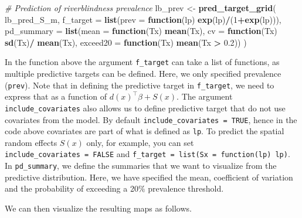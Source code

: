 \documentclass[
  letterpaper,
]{krantz}
\newenvironment{Shaded}{\begin{snugshade}}{\end{snugshade}}
\newcommand{\AttributeTok}[1]{\textcolor[rgb]{0.13,0.29,0.53}{#1}}
\newcommand{\CommentTok}[1]{\textcolor[rgb]{0.56,0.35,0.01}{\textit{#1}}}
\newcommand{\ControlFlowTok}[1]{\textcolor[rgb]{0.13,0.29,0.53}{\textbf{#1}}}
\newcommand{\DecValTok}[1]{\textcolor[rgb]{0.00,0.00,0.81}{#1}}
\newcommand{\FloatTok}[1]{\textcolor[rgb]{0.00,0.00,0.81}{#1}}
\newcommand{\FunctionTok}[1]{\textcolor[rgb]{0.13,0.29,0.53}{\textbf{#1}}}
\newcommand{\NormalTok}[1]{#1}
\newcommand{\OtherTok}[1]{\textcolor[rgb]{0.56,0.35,0.01}{#1}}
\newcommand{\SpecialCharTok}[1]{\textcolor[rgb]{0.81,0.36,0.00}{\textbf{#1}}}
\begin{document}
\begin{Shaded}
\begin{Highlighting}[]

\CommentTok{\# Prediction of riverblindness prevalence}
\NormalTok{lb\_prev }\OtherTok{\textless{}{-}} 
\FunctionTok{pred\_target\_grid}\NormalTok{(}
\NormalTok{  lb\_pred\_S\_m, }
  \AttributeTok{f\_target =} \FunctionTok{list}\NormalTok{(}\AttributeTok{prev =} \ControlFlowTok{function}\NormalTok{(lp) }\FunctionTok{exp}\NormalTok{(lp)}\SpecialCharTok{/}\NormalTok{(}\DecValTok{1}\SpecialCharTok{+}\FunctionTok{exp}\NormalTok{(lp))),}
  \AttributeTok{pd\_summary =} \FunctionTok{list}\NormalTok{(}\AttributeTok{mean =} \ControlFlowTok{function}\NormalTok{(Tx) }\FunctionTok{mean}\NormalTok{(Tx), }
                    \AttributeTok{cv =} \ControlFlowTok{function}\NormalTok{(Tx) }\FunctionTok{sd}\NormalTok{(Tx)}\SpecialCharTok{/} \FunctionTok{mean}\NormalTok{(Tx),}
                    \AttributeTok{exceed20 =} \ControlFlowTok{function}\NormalTok{(Tx) }\FunctionTok{mean}\NormalTok{(Tx }\SpecialCharTok{\textgreater{}} \FloatTok{0.2}\NormalTok{))}
\NormalTok{)}
\end{Highlighting}
\end{Shaded}

In the function above the argument \texttt{f\_target} can take a list of
functions, as multiple predictive targets can be defined. Here, we only
specified prevalence (\texttt{prev}). Note that in defining the
predictive target in \texttt{f\_target}, we need to express that as a
function of \(d(x)^\top \beta + S(x)\). The argument
\texttt{include\_covariates} also allows us to define predictive target
that do not use covariates from the model. By default
\texttt{include\_covariates\ =\ TRUE}, hence in the code above
covariates are part of what is defined as \texttt{lp}. To predict the
spatial random effects \(S(x)\) only, for example, you can set
\texttt{include\_covariates\ =\ FALSE} and
\texttt{f\_target\ =\ list(Sx\ =\ function(lp)\ lp)}. In
\texttt{pd\_summary}, we define the summaries that we want to visualize
from the predictive distribution. Here, we have specified the mean,
coefficient of variation and the probability of exceeding a 20\(\%\)
prevalence threshold.

We can then visualize the resulting maps as follows.
\end{document}
